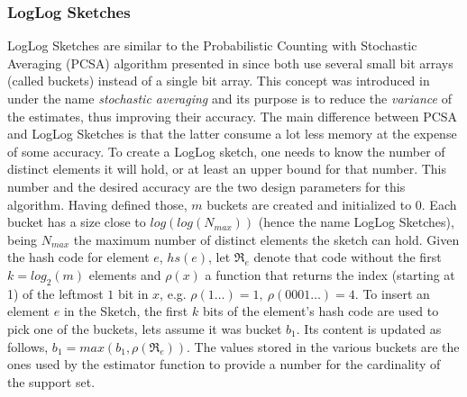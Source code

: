\subsubsection{LogLog Sketches}
\label{sec:loglog-sketches}
LogLog Sketches \cite{Durand:2003tc} are similar to the Probabilistic
Counting with Stochastic Averaging (PCSA) algorithm presented in
\cite{Flajolet:1985wd} since both use several small bit arrays (called
buckets) instead of a single bit array. This concept was introduced in
\cite{Flajolet:1985wd} under the name \emph{stochastic averaging} and
its purpose is to reduce the \emph{variance} of the estimates, thus
improving their accuracy. The main difference between PCSA and LogLog
Sketches is that the latter consume a lot less memory at the expense
of some accuracy. To create a LogLog sketch, one needs to know the
number of distinct elements it will hold, or at least an upper bound
for that number. This number and the desired accuracy are the
two design parameters for this algorithm. Having defined those, $m$
buckets are created and initialized to $0$. Each bucket has a size
close to $log(log(N_{max}))$ (hence the name LogLog Sketches), being
$N_{max}$ the maximum number of distinct elements the sketch can hold.
Given the hash code for element $e$, $hs(e)$, let $\mathfrak{R}_e$
denote that code without the first $k=log_2(m)$ elements and $\rho(x)$
a function that returns the index (starting at 1) of the leftmost $1$
bit in $x$, e.g. $\rho(1\ldots)=1,\ \rho(0001\ldots)=4$. To insert an
element $e$ in the Sketch, the first $k$ bits of the element's hash
code are used to pick one of the buckets, lets assume it was bucket
$b_1$. Its content is updated as follows,
$b_1=max(b_1,\rho(\mathfrak{R}_e))$. The values stored in the various
buckets are the ones used by the estimator function to provide a
number for the cardinality of the support set.

